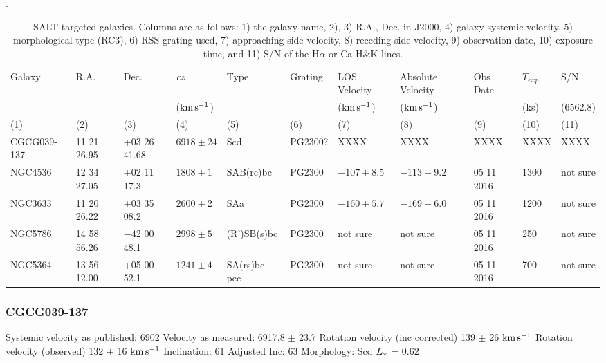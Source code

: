 \documentclass[iop]{emulateapj-rtx4}
\newcommand{\kms}{$\rm km\, s^{-1}$}
\begin{document}
\begin{table}[ht]\footnotesize. 
\begin{center}
\begin{tabular}{l l l l l l l l l l l}
 \hline \hline
  Galaxy 		 & R.A. 			& Dec. 		 	& \textit{cz}		& Type		& Grating		& LOS Velocity		& Absolute Velocity	& Obs Date	& $T_{exp}$		& S/N			\\ 
  	    		 & 	       			&	  		 	& (\kms)			& 		  	&			& (\kms)		     	& (\kms)			&			& (ks)			& (6562.8)			\\ 
 \scriptsize (1)  	 & \scriptsize (2)	& \scriptsize (3) 	& \scriptsize (4)		& \scriptsize (5)	& \scriptsize (6)	& \scriptsize (7)		& \scriptsize (8)		& \scriptsize (9)	& \scriptsize (10)	& \scriptsize (11)	\\ \hline \hline
 
 CGCG039-137 & 11 21 26.95		& +03 26 41.68		& $6918 \pm24$	& Scd		& PG2300?	& XXXX			& XXXX			& XXXX		& XXXX			& 	XXXX		\\
 
 NGC4536	 & 12 34 27.05		& +02 11 17.3		& $1808 \pm1$		& SAB(rc)bc	& PG2300		& $-107 \pm 8.5$	& $-113 \pm 9.2$	& 05 11 2016	& 1300			& not sure \\
			
 NGC3633	 & 11 20 26.22		& +03 35 08.2		& $2600 \pm2$		& SAa		& PG2300		& $-160 \pm 5.7$	& $-169 \pm 6.0$	& 05 11 2016	& 1200			& not sure \\
			
 NGC5786	 & 14 58 56.26		& $-$42 00 48.1	& $2998 \pm5$		& (R')SB(s)bc	& PG2300		& not sure			& not sure			& 05 11 2016	& 250			& not sure \\

 NGC5364	 & 13 56 12.00		& +05 00 52.1		& $1241 \pm4$		& SA(rs)bc pec	& PG2300		& not sure			& not sure			& 05 11 2016	& 700			& not sure \\
 	
 
 \hline

\end{tabular}
\end{center}
  \caption{\small{SALT targeted galaxies. Columns are as follows: 1) the galaxy name, 2), 3) R.A., Dec. in J2000, 4) galaxy systemic velocity, 5) morphological type (RC3), 6) RSS grating used, 7) approaching side velocity, 8) receding side velocity, 9) observation date, 10) exposure time, and 11) S/N of the H$\alpha$ or Ca H\&K lines.}}
  \label{salt_targets}
\end{table}

\subsubsection{CGCG039-137}
Systemic velocity as published: 6902
Velocity as measured: 6917.8 $\pm$ 23.7
Rotation velocity (inc corrected) 139 $\pm$ 26 \kms
Rotation velocity (observed) 132 $\pm$ 16 \kms
Inclination: 61
Adjusted Inc: 63
Morphology: Scd
$L_{\**}$ = 0.62 \\
\end{document}
